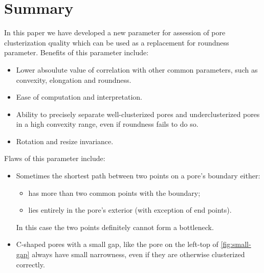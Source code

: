 \documentclass[reprint,amsmath,amssymb,aps,pre,showkeys,showpacs]{revtex4-1}
\begin{document}
\section{Summary}
In this paper we have developed a new parameter for assession of pore
clusterization quality which can be used as a replacement for roundness
parameter. Benefits of this parameter include:
\begin{itemize}
\item Lower absoulute value of correlation with other common parameters, such as
  convexity, elongation and roundness.
\item Ease of computation and interpretation.
\item Ability to precisely separate well-clusterized pores and underclusterized
  pores in a high convexity range, even if roundness fails to do so.
\item Rotation and resize invariance.
\end{itemize}

Flaws of this parameter include:
\begin{itemize}
\item Sometimes the shortest path between two points on a pore's boundary either:
  \begin{itemize}
  \item has more than two common points with the boundary;
  \item lies entirely in the pore's exterior (with exception of end points).
  \end{itemize}
  In this case the two points definitely cannot form a bottleneck.
\item C-shaped pores with a small gap, like the pore on the left-top of
  \cref{fig:small-gap} always have small narrowness, even if they are otherwise
  clusterized correctly.
\end{itemize}
\end{document}

